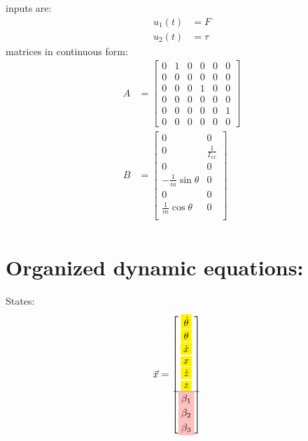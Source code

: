 \documentclass[12pt]{article}
\begin{document}
inputs are:
\begin{align*}
    u_1(t) &= F \\
    u_2(t) &= \tau
\end{align*}
matrices in continuous form:
\begin{align*}
    A &= \begin{bmatrix}
        0 & 1 & 0 & 0 & 0 & 0 \\
        0 & 0 & 0 & 0 & 0 & 0 \\
        0 & 0 & 0 & 1 & 0 & 0 \\
        0 & 0 & 0 & 0 & 0 & 0 \\
        0 & 0 & 0 & 0 & 0 & 1 \\
        0 & 0 & 0 & 0 & 0 & 0
    \end{bmatrix} \\
    B &= \begin{bmatrix}
        0 & 0 \\
        0 & \frac{1}{I_{xx}} \\
        0 & 0 \\
        - \frac{1}{m} \sin{\theta} & 0 \\
        0 & 0 \\
        \frac{1}{m} \cos{\theta} & 0 \\
    \end{bmatrix} \\
\end{align*}

\section*{Organized dynamic equations:}

States:
\begin{align*}
    \vec{x} &= \begin{bmatrix}
        \colorbox{yellow}{$\dot{\theta}$} \\
        \colorbox{yellow}{$\theta$} \\
        \colorbox{yellow}{$\dot{x}$} \\
        \colorbox{yellow}{$x$} \\
        \colorbox{yellow}{$\dot{z}$} \\
        \colorbox{yellow}{$z$} \\
        \hline
        \colorbox{pink}{$\beta_1$} \\
        \colorbox{pink}{$\beta_2$} \\
        \colorbox{pink}{$\beta_3$} \\
    \end{bmatrix}
\end{align*}
\end{document}
